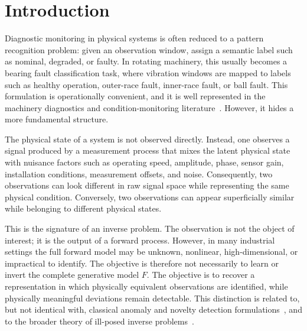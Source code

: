 \documentclass[11pt,letterpaper]{article}
\begin{document}
\begin{abstract}
After establishing the mathematical object, we introduce one computational approximation. Nominal trajectories are generated by Monte Carlo simulation over nuisance variables, a simple one-dimensional convolutional autoencoder is trained only on the synthetic nominal orbit, and the reconstruction error is used as an inverse-problem residual. An adaptive threshold estimates the local boundary of the nominal manifold for each physical asset. Synthetic validation on four parallel bearing signals provides preliminary evidence that quotient-space recovery is operationally feasible under controlled conditions. The experiments do not prove the mathematical formulation itself; they demonstrate that one computational approximation can recover sufficient quotient geometry to support anomaly detection and subsequent signal classification.
\end{abstract}

\section{Introduction}
Diagnostic monitoring in physical systems is often reduced to a pattern recognition problem: given an observation window, assign a semantic label such as nominal, degraded, or faulty. In rotating machinery, this usually becomes a bearing fault classification task, where vibration windows are mapped to labels such as healthy operation, outer-race fault, inner-race fault, or ball fault. This formulation is operationally convenient, and it is well represented in the machinery diagnostics and condition-monitoring literature~\cite{jardine2006,randall2011,zhao2019}. However, it hides a more fundamental structure.

The physical state of a system is not observed directly. Instead, one observes a signal produced by a measurement process that mixes the latent physical state with nuisance factors such as operating speed, amplitude, phase, sensor gain, installation conditions, measurement offsets, and noise. Consequently, two observations can look different in raw signal space while representing the same physical condition. Conversely, two observations can appear superficially similar while belonging to different physical states.

This is the signature of an inverse problem. The observation is not the object of interest; it is the output of a forward process. However, in many industrial settings the full forward model may be unknown, nonlinear, high-dimensional, or impractical to identify. The objective is therefore not necessarily to learn or invert the complete generative model \(F\). The objective is to recover a representation in which physically equivalent observations are identified, while physically meaningful deviations remain detectable. This distinction is related to, but not identical with, classical anomaly and novelty detection formulations~\cite{chandola2009,scholkopf1999,bishop1994}, and to the broader theory of ill-posed inverse problems~\cite{hadamard,tikhonov}.
\end{document}
